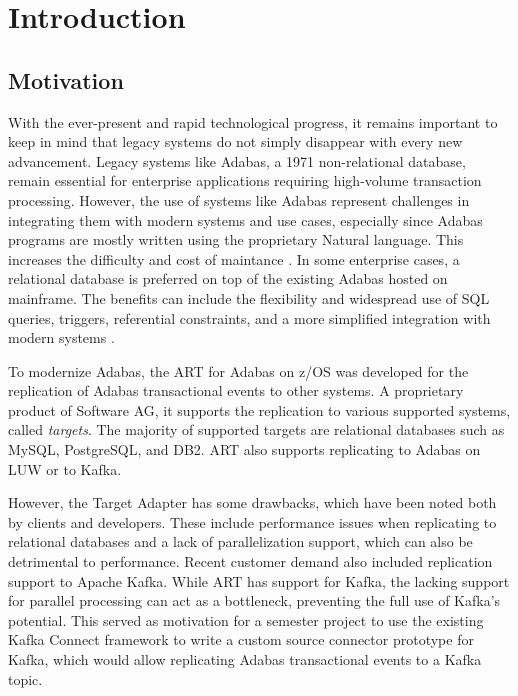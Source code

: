 \chapter{Introduction}
\label{ch01:intro}

\section{Motivation}
\label{ch01:intro:motivation}
With the ever-present and rapid technological progress, it remains important to keep in mind that legacy systems do not simply disappear with every new advancement. Legacy systems like Adabas, a 1971 non-relational database, remain essential for enterprise applications requiring high-volume transaction processing. However, the use of systems like Adabas represent challenges in integrating them with modern systems and use cases, especially since Adabas programs are mostly written using the proprietary Natural language. This increases the difficulty and cost of maintance \cite{ibm_redpaper_key}. In some enterprise cases, a relational database is preferred on top of the existing Adabas hosted on mainframe. The benefits can include the flexibility and widespread use of SQL queries, triggers, referential constraints, and a more simplified integration with modern systems \cite{ibm_redpaper_key}.

To modernize Adabas, the \ac{ART} for Adabas on z/OS was developed for the replication of Adabas transactional events to other systems. A proprietary product of Software AG, it supports the replication to various supported systems, called \textit{targets}. The majority of supported targets are relational databases such as MySQL, PostgreSQL, and DB2. \ac{ART} also supports replicating to Adabas on \ac{LUW} or to Kafka. %

However, the Target Adapter has some drawbacks, which have been noted both by clients and developers. These include performance issues when replicating to relational databases and a lack of parallelization support, which can also be detrimental to performance. Recent customer demand also included replication support to Apache Kafka. While \ac{ART} has support for Kafka, the lacking support for parallel processing can act as a bottleneck, preventing the full use of Kafka's potential. This served as motivation for a semester project to use the existing Kafka Connect framework to write a custom source connector prototype for Kafka, which would allow replicating Adabas transactional events to a Kafka topic.


